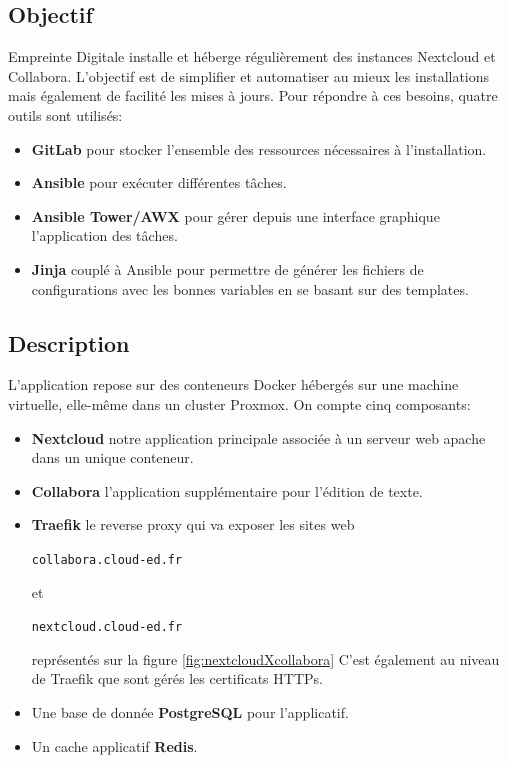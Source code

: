 \documentclass[12pt]{article}
\begin{document}
\subsection{Objectif}
Empreinte Digitale installe et héberge régulièrement des instances \gls{Nextcloud} et \gls{Collabora}. 
L'objectif est de simplifier et automatiser au mieux les installations mais également de facilité les mises à jours.
Pour répondre à ces besoins, quatre outils sont utilisés:
\begin{itemize}
    \item \textbf{\gls{GitLab}} pour stocker l'ensemble des ressources nécessaires à l'installation.
    \item \textbf{\gls{Ansible}} pour exécuter différentes tâches.
    \item \textbf{\gls{Ansible} Tower/AWX} pour gérer depuis une interface graphique l'application des tâches.
    \item \textbf{\gls{Jinja}} couplé à \gls{Ansible} pour permettre de générer les fichiers de configurations avec les bonnes variables en se basant sur des templates.
\end{itemize}

\subsection{Description}
L'application repose sur des conteneurs Docker hébergés sur une machine virtuelle, elle-même dans un \gls{cluster} \gls{Proxmox}. On compte cinq composants:
\begin{itemize}
    \item \textbf{\gls{Nextcloud}} notre application principale associée à un serveur web apache dans un unique conteneur.
    \item \textbf{\gls{Collabora}} l'application supplémentaire pour l'édition de texte.
    \item \textbf{\gls{Traefik}} le reverse proxy qui va exposer les sites web \begin{code}\texttt{collabora.cloud-ed.fr}\end{code} et \begin{code}\texttt{nextcloud.cloud-ed.fr}\end{code} représentés sur la figure \ref{fig:nextcloudXcollabora}
    C'est également au niveau de \gls{Traefik} que sont gérés les certificats HTTPs.
    \item Une base de donnée \textbf{PostgreSQL} pour l'applicatif.
    \item Un cache applicatif \textbf{Redis}.
\end{itemize}
\end{document}
